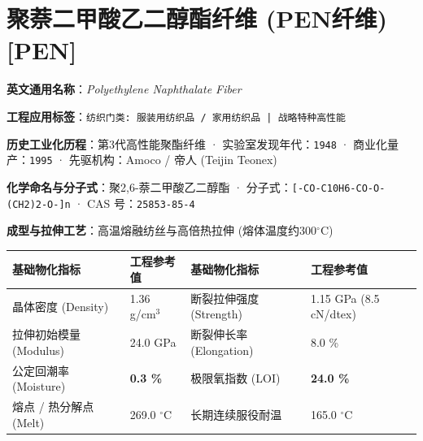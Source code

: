 \documentclass[11pt,openright,twoside,UTF8]{ctexbook}
\begin{document}
\section{聚萘二甲酸乙二醇酯纤维 (PEN纤维) [PEN]}
\label{sec:pen}

\noindent\textbf{英文通用名称}：\textit{Polyethylene Naphthalate Fiber}\par
\noindent\textbf{工程应用标签}：\texttt{纺织门类: 服装用纺织品 / 家用纺织品 | 战略特种高性能}\par
\noindent\textbf{历史工业化历程}：第3代高性能聚酯纤维 · 实验室发现年代：\texttt{1948} · 商业化量产：\texttt{1995} · 先驱机构：Amoco / 帝人 (Teijin Teonex)\par
\noindent\textbf{化学命名与分子式}：聚2,6-萘二甲酸乙二醇酯 · 分子式：\texttt{[-CO-C10H6-CO-O-(CH2)2-O-]n} · CAS 号：\texttt{25853-85-4}\par
\noindent\textbf{成型与拉伸工艺}：高温熔融纺丝与高倍热拉伸 (熔体温度约300$^\circ\mathrm{C}$)\par

\vspace{0.15cm}
\begin{center}
\small
\begin{tabularx}{\textwidth}{p{3.8cm}Xp{3.8cm}X}
\toprule
\textbf{基础物化指标} & \textbf{工程参考值} & \textbf{基础物化指标} & \textbf{工程参考值} \\
\midrule
晶体密度 (Density) & 1.36 g/cm$^3$ & 断裂拉伸强度 (Strength) & 1.15 GPa (8.5 cN/dtex) \\
拉伸初始模量 (Modulus) & 24.0 GPa & 断裂伸长率 (Elongation) & 8.0 \% \\
公定回潮率 (Moisture) & \textbf{0.3 \%} & 极限氧指数 (LOI) & \textbf{24.0 \%} \\
熔点 / 热分解点 (Melt) & 269.0 $^\circ\mathrm{C}$ & 长期连续服役耐温 & 165.0 $^\circ\mathrm{C}$ \\
\bottomrule
\end{tabularx}
\end{center}
\vspace{0.15cm}
\end{document}

